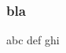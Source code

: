 \documentclass{beamer}
\begin{document}
\begin{frame}
\frametitle{bla}
    abc
    \pause
    \pause
    def
    \pause
    ghi
\end{frame} 
\end{document}
